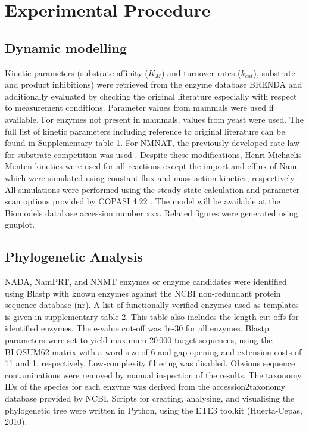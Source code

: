 
\section{Experimental Procedure}

\subsection{Dynamic modelling}

Kinetic parameters (substrate affinity ($K_{M}$) and turnover rates ($k_{cat}$), substrate and product inhibitions) were retrieved from the enzyme database BRENDA and additionally evaluated by checking the original literature especially with respect to measurement conditions. Parameter values from mammals were used if available. For enzymes not present in mammals, values from yeast were used. The full list of kinetic parameters including reference to original literature can be found in Supplementary table 1. For NMNAT, the previously developed rate law for substrate competition was used \cite{Schauble2013}. Despite these modifications, Henri-Michaelis-Menten kinetics were used for all reactions except the import and efflux of Nam, which were simulated using constant flux and mass action kinetics, respectively. All simulations were performed using the steady state calculation and parameter scan options provided by COPASI 4.22 \cite{Hoops2006}. The model will be available at the Biomodels database accession number xxx. Related figures were generated using gnuplot.


\subsection{Phylogenetic Analysis}

NADA, NamPRT, and NNMT enzymes or enzyme candidates were identified using Blastp with known enzymes against the NCBI non-redundant protein sequence database (nr). A list of functionally verified enzymes used as templates is given in supplementary table 2. This table also includes the length cut-offs for identified enzymes. The e-value cut-off was 1e-30 for all enzymes. Blastp parameters were set to yield maximum 20\,000 target sequences, using the BLOSUM62 matrix with a word size of 6 and gap opening and extension costs of 11 and 1, respectively. Low-complexity filtering was disabled. Obvious sequence contaminations were removed by manual inspection of the results. The taxonomy IDs of the species for each enzyme was derived from the accession2taxonomy database provided by NCBI. Scripts for creating, analysing, and visualising the phylogenetic tree were written in Python, using the ETE3 toolkit (Huerta-Cepas, 2010).


